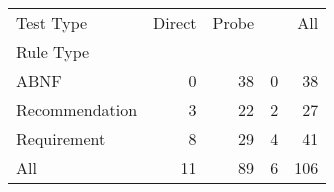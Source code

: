 \begin{tabular}{lrrrr}
\toprule
Test Type &  Direct &  Probe &  \Multi{} &  All \\
Rule Type      &         &        &           &      \\
\midrule
ABNF           &       0 &     38 &         0 &   38 \\
Recommendation &       3 &     22 &         2 &   27 \\
Requirement    &       8 &     29 &         4 &   41 \\
All            &      11 &     89 &         6 &  106 \\
\bottomrule
\end{tabular}
